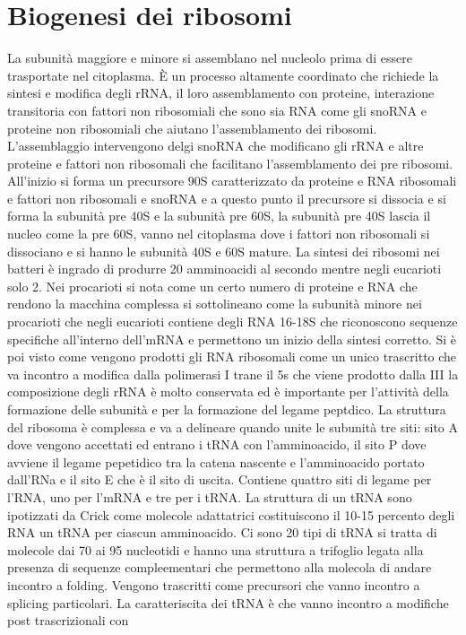 \section{Biogenesi dei ribosomi}
La subunit\`a maggiore e minore si assemblano nel nucleolo prima di essere trasportate nel citoplasma. \`E un processo altamente coordinato che richiede la sintesi e modifica degli rRNA, 
il loro assemblamento con proteine, interazione transitoria con fattori non ribosomiali che sono sia RNA come gli snoRNA e proteine non ribosomiali che aiutano l'assemblamento dei 
ribosomi. L'assemblaggio intervengono delgi snoRNA che modificano gli rRNA e altre proteine e fattori non ribosomali che facilitano l'assemblamento dei pre ribosomi. All'inizio si 
forma un precursore 90S caratterizzato da proteine e RNA ribosomali e fattori non ribosomali e snoRNA e a questo punto il precursore si dissocia e si forma la subunit\`a pre 40S e la
subunit\`a pre 60S, la subunit\`a pre 40S lascia il nucleo come la pre 60S, vanno nel citoplasma dove i fattori non ribosomali si dissociano e si hanno le subunit\`a 40S e 60S mature. 
La sintesi dei ribosomi nei batteri \`e ingrado di produrre 20 amminoacidi al secondo mentre negli eucarioti solo 2. Nei procarioti si nota come un certo numero di proteine e RNA che
rendono la macchina complessa si sottolineano come la subunit\`a minore nei procarioti che negli eucarioti contiene degli RNA 16-18S che riconoscono sequenze specifiche all'interno 
dell'mRNA e permettono un inizio della sintesi corretto. Si \`e poi visto come vengono prodotti gli RNA ribosomali come un unico trascritto che va incontro a modifica dalla polimerasi
I trane il 5s che viene prodotto dalla III la composizione degli rRNA \`e molto conservata ed \`e importante per l'attivit\`a della formazione delle subunit\`a e per la formazione del
legame peptdico. La struttura del ribosoma \`e complessa e va a delineare quando unite le subunit\`a tre siti: sito A dove vengono accettati ed entrano i tRNA con l'amminoacido, il sito
P dove avviene il legame pepetidico tra la catena nascente e l'amminoacido portato dall'RNa e il sito E che \`e il sito di uscita. Contiene quattro siti di legame per l'RNA, uno per 
l'mRNA e tre per i tRNA. La struttura di un tRNA sono ipotizzati da Crick come molecole adattatrici costituiscono il 10-15 percento degli RNA un tRNA per ciascun amminoacido. Ci sono
20 tipi di tRNA si tratta di molecole dai 70 ai 95 nucleotidi e hanno una struttura a trifoglio legata alla presenza di sequenze compleementari che permettono alla molecola di andare 
incontro a folding. Vengono trascritti come precursori che vanno incontro a splicing particolari. La caratteriscita dei tRNA \`e che vanno incontro a modifiche post trascrizionali con 
